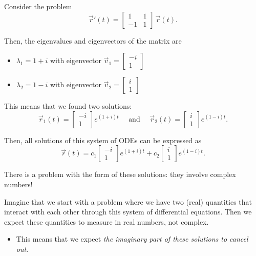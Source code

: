 \begin{example}
Consider the problem
$$
\vec{r}'(t) = \begin{bmatrix}	
 1 & 1 \\ -1 & 1
 \end{bmatrix} \, \vec{r}(t).
$$

Then, the eigenvalues and eigenvectors of the matrix are
\begin{itemize}
	\item $\lambda_1=1+i$ with eigenvector $\vec{v}_1 = \begin{bmatrix} -i \\ 1 \end{bmatrix}$
	\item $\lambda_2=1-i$ with eigenvector $\vec{v}_2 = \begin{bmatrix} i \\ 1 \end{bmatrix}$
\end{itemize}

This means that we found two solutions:
$$
\vec{r}_1(t) = \begin{bmatrix} -i \\ 1 \end{bmatrix} e^{(1+i)t}
\quad \text{ and } \quad \vec{r}_2(t) = \begin{bmatrix} i \\ 1 \end{bmatrix} e^{(1-i)t}.
$$

Then, all solutions of this system of ODEs can be expressed as
$$
\vec{r}(t) = c_1 \begin{bmatrix} -i \\ 1 \end{bmatrix} e^{(1+i)t}
+c_2\begin{bmatrix} i \\ 1 \end{bmatrix} e^{(1-i)t}.
$$

There is a problem with the form of these solutions: they involve complex numbers!

Imagine that we start with a problem where we have two (real) quantities that interact with each other through this system of differential equations.
Then we expect these quantities to measure in real numbers, not complex.

\begin{itemize}
	\item This means that we expect \emph{the imaginary part of these solutions to cancel out}.
\end{itemize}


\end{example}
